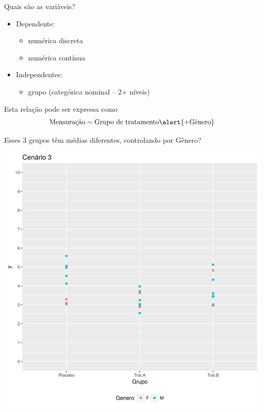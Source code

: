 \documentclass{beamer}
\begin{document}
\begin{frame}{Quais são as variáveis?}
  \begin{itemize}
    \small
  \item Dependente:
    \begin{itemize}
      \footnotesize
    \item numérica discreta
    \item numérica contínua
    \end{itemize}
  \item Independentes:
    \begin{itemize}
      \footnotesize
    \item grupo (categórica nominal -- 2+ níveis)
    \end{itemize}
  \end{itemize}
  \vfill
  \begin{block}{Esta relação pode ser expressa como}
    \begin{displaymath}
      \text{Mensuração} \sim \text{Grupo de tratamento} \alert{+ \text{Gênero}}
    \end{displaymath}
  \end{block}
\end{frame}

\begin{frame}{Esses 3 grupos têm médias diferentes, controlando por Gênero?}
  \begin{center}
    \includegraphics[height=.9\textheight]{Cap13-30/cenario12}
  \end{center}
\end{frame}
\end{document}
